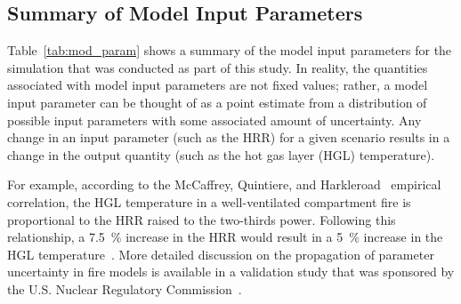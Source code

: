 \subsection{Summary of Model Input Parameters}
\label{sec:summary_of_model_inputs}

Table~\ref{tab:mod_param} shows a summary of the model input parameters for the simulation that was conducted as part of this study. In reality, the quantities associated with model input parameters are not fixed values; rather, a model input parameter can be thought of as a point estimate from a distribution of possible input parameters with some associated amount of uncertainty. Any change in an input parameter (such as the HRR) for a given scenario results in a change in the output quantity (such as the hot gas layer (HGL) temperature).

For example, according to the McCaffrey, Quintiere, and Harkleroad~\cite{SFPE:Walton} empirical correlation, the HGL temperature in a well-ventilated compartment fire is proportional to the HRR raised to the two-thirds power. Following this relationship, a 7.5~\% increase in the HRR would result in a 5~\% increase in the HGL temperature~\cite{NUREG_1824_Sup_1}. More detailed discussion on the propagation of parameter uncertainty in fire models is available in a validation study that was sponsored by the U.S. Nuclear Regulatory Commission~\cite{NUREG_1824_Sup_1}.

